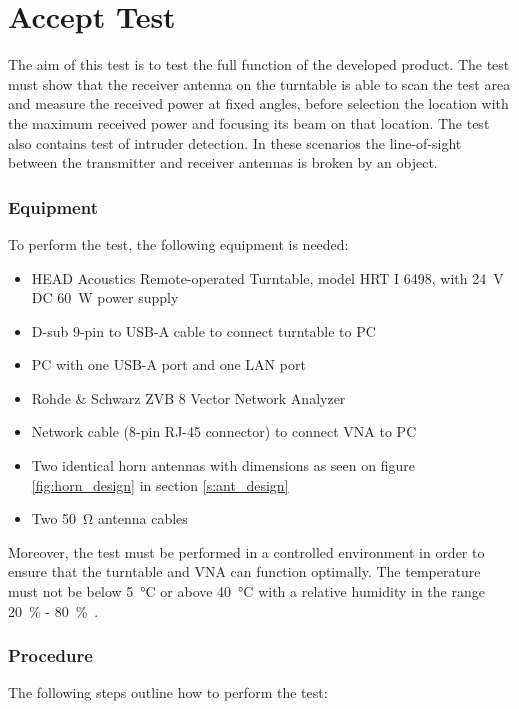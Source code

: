 \section{Accept Test}
The aim of this test is to test the full function of the developed product. The test must show that the receiver antenna on the turntable is able to scan the test area and measure the received power at fixed angles, before selection the location with the maximum received power and focusing its beam on that location. The test also contains test of intruder detection. In these scenarios the line-of-sight between the transmitter and receiver antennas is broken by an object. 

\subsubsection{Equipment}
To perform the test, the following equipment is needed:

\begin{itemize}
    \item HEAD Acoustics Remote-operated Turntable, model HRT I 6498, with \SI{24}{\volt} DC \SI{60}{W} power supply
    \item D-sub 9-pin to USB-A cable to connect turntable to PC
    \item PC with one USB-A port and one LAN port
    \item Rohde \& Schwarz ZVB 8 Vector Network Analyzer
    \item Network cable (8-pin RJ-45 connector) to connect VNA to PC
    \item Two identical horn antennas with dimensions as seen on figure \ref{fig:horn_design} in section \ref{s:ant_design}
    \item Two \SI{50}{\ohm} antenna cables
\end{itemize}

Moreover, the test must be performed in a controlled environment in order to ensure that the turntable and VNA can function optimally. The temperature must not be below \SI{5}{\celsius} or above \SI{40}{\celsius} with a relative humidity in the range \SI{20}{\percent} - \SI{80}{\percent}~\cite{hrt_i_data_sheet}\cite{vna_data_sheet_spec}.

\subsubsection{Procedure}
The following steps outline how to perform the test:

